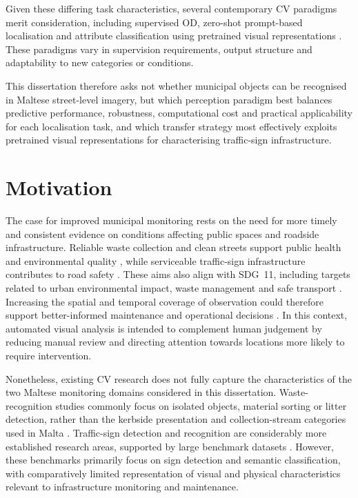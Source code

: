 Given these differing task characteristics, several contemporary \gls{CV} paradigms merit consideration, including supervised \gls{OD}, zero-shot prompt-based localisation and attribute classification using pretrained visual representations \cite{BG33-object-detection,I9,BG37-open-vocabulary,BG41-visual-attributes}. These paradigms vary in supervision requirements, output structure and adaptability to new categories or conditions.

\noindent This dissertation therefore asks not whether municipal objects can be recognised in Maltese street-level imagery, but which perception paradigm best balances predictive performance, robustness, computational cost and practical applicability for each localisation task, and which transfer strategy most effectively exploits pretrained visual representations for characterising traffic-sign infrastructure.

\section{Motivation}
\label{sec:motivation}
The case for improved municipal monitoring rests on the need for more timely and consistent evidence on conditions affecting public spaces and roadside infrastructure. Reliable waste collection and clean streets support public health and environmental quality \cite{BG8-waste-impacts}, while serviceable traffic-sign infrastructure contributes to road safety \cite{BG5-sign-monitoring}. These aims also align with \gls{SDG}~11, including targets related to urban environmental impact, waste management and safe transport \cite{un2015sdgs}. Increasing the spatial and temporal coverage of observation could therefore support better-informed maintenance and operational decisions \cite{kumar2026gvp}. In this context, automated visual analysis is intended to complement human judgement by reducing manual review and directing attention towards locations more likely to require intervention.

Nonetheless, existing \gls{CV} research does not fully capture the characteristics of the two Maltese monitoring domains considered in this dissertation. Waste-recognition studies commonly focus on isolated objects, material sorting or litter detection, rather than the kerbside presentation and collection-stream categories used in Malta \cite{bartolo2026aeriallitter,proenca2020taco,MJU-Waste}. Traffic-sign detection and recognition are considerably more established research areas, supported by large benchmark datasets \cite{houben2013gtsdb, stallkamp2012gtsrb, ertler2020mapillary,katsamenis2025dorie}. However, these benchmarks primarily focus on sign detection and semantic classification, with comparatively limited representation of visual and physical characteristics relevant to infrastructure monitoring and maintenance.

